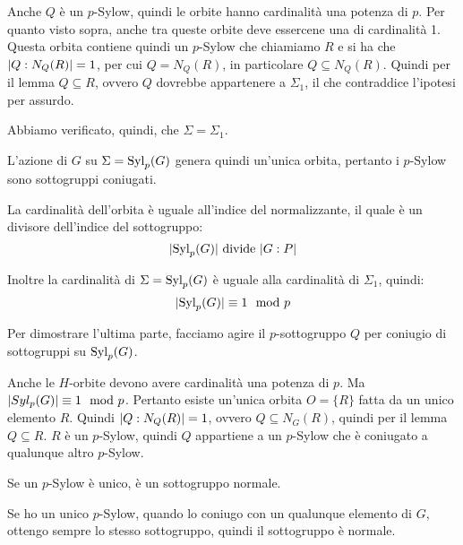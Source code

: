 \begin{dimostrazione}
    Anche $Q$ è un $p$-Sylow, quindi le orbite hanno cardinalità una potenza di $p$.
    Per quanto visto sopra, anche tra queste orbite deve essercene una di cardinalità 1.
    Questa orbita contiene quindi un $p$-Sylow che chiamiamo $R$ e si ha che $\lvert Q:N_Q(R) \rvert = 1$,
    per cui $Q = N_Q(R)$, in particolare $Q \subseteq N_Q(R)$.
    Quindi per il lemma $Q \subseteq R$, ovvero $Q$ dovrebbe appartenere a $\Sigma_1$, il che contraddice l'ipotesi
    per assurdo.

    Abbiamo verificato, quindi, che $\Sigma = \Sigma_1$.

    L'azione di $G$ su $\Sigma = \operatorname{Syl}_p(G)$ genera quindi un'unica orbita, pertanto i $p$-Sylow sono sottogruppi
    coniugati.

    La cardinalità dell'orbita è uguale all'indice del normalizzante, il quale è un divisore dell'indice del sottogruppo:
    \begin{equation*}
        \lvert \operatorname{Syl}_p(G) \rvert \text{ divide } \lvert G:P \rvert
    \end{equation*}

    Inoltre la cardinalità di $\Sigma = \operatorname{Syl}_p(G)$ è uguale alla cardinalità di $\Sigma_1$, quindi:
    \begin{equation*}
        \lvert \operatorname{Syl}_p(G) \rvert \equiv 1 \mod p
    \end{equation*}

    Per dimostrare l'ultima parte, facciamo agire il $p$-sottogruppo $Q$ per coniugio di sottogruppi su $\operatorname{Syl}_p(G)$.

    Anche le $H$-orbite devono avere cardinalità una potenza di $p$.
    Ma $\lvert Syl_p(G) \rvert \equiv 1 \mod p$.
    Pertanto esiste un'unica orbita $O = \{R\}$ fatta da un unico elemento $R$.
    Quindi $\lvert Q:N_Q(R) \rvert = 1$, ovvero $Q \subseteq N_G(R)$, quindi per il lemma $Q \subseteq R$.
    $R$ è un $p$-Sylow, quindi $Q$ appartiene a un $p$-Sylow che è coniugato a qualunque altro $p$-Sylow.
\end{dimostrazione}

\begin{corollario}
    Se un $p$-Sylow è unico, è un sottogruppo normale.
\end{corollario}
\begin{dimostrazione}
    Se ho un unico $p$-Sylow, quando lo coniugo con un qualunque elemento di $G$, ottengo sempre lo stesso sottogruppo, quindi il
    sottogruppo è normale.
\end{dimostrazione}

